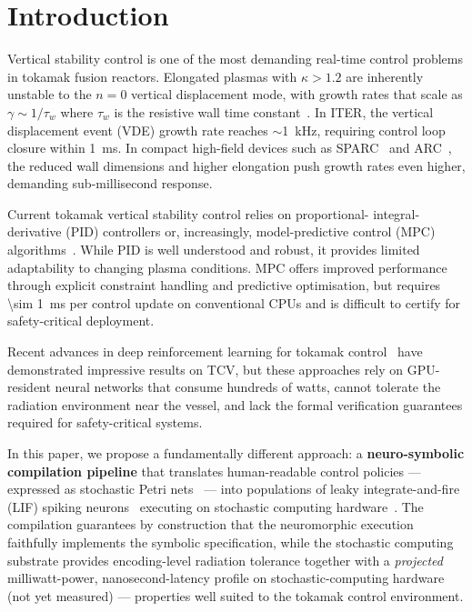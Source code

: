 \documentclass[12pt]{article}
\begin{document}
\section{Introduction}
\label{sec:intro}

Vertical stability control is one of the most demanding real-time
control problems in tokamak fusion reactors.  Elongated plasmas with
$\kappa > 1.2$ are inherently unstable to the $n = 0$ vertical
displacement mode, with growth rates that scale as
$\gamma \sim 1/\tau_w$ where $\tau_w$ is the resistive wall time
constant~\citep{Lazarus1990}.  In ITER, the vertical displacement event
(VDE) growth rate reaches $\sim$\SI{1}{\kilo\hertz}, requiring control
loop closure within \SI{1}{\milli\second}.  In compact high-field
devices such as SPARC~\citep{Creely2020} and
ARC~\citep{Sorbom2015}, the reduced wall dimensions and higher
elongation push growth rates even higher, demanding sub-millisecond
response.

Current tokamak vertical stability control relies on proportional-
integral-derivative (PID) controllers or, increasingly, model-predictive
control (MPC) algorithms~\citep{Humphreys2015,Kolemen2014}.  While PID
is well understood and robust, it provides limited adaptability to
changing plasma conditions.  MPC offers improved performance through
explicit constraint handling and predictive optimisation, but requires
\SI{\sim 1}{\milli\second} per control update on conventional CPUs and
is difficult to certify for safety-critical deployment.

Recent advances in deep reinforcement learning for tokamak
control~\citep{Degrave2022} have demonstrated impressive results on
TCV, but these approaches rely on GPU-resident neural networks that
consume hundreds of watts, cannot tolerate the radiation environment
near the vessel, and lack the formal verification guarantees required
for safety-critical systems.

In this paper, we propose a fundamentally different approach: a
\textbf{neuro-symbolic compilation pipeline} that translates
human-readable control policies --- expressed as stochastic Petri
nets~\citep{Petri1962,Murata1989} --- into populations of
leaky integrate-and-fire (LIF) spiking
neurons~\citep{Maass1997} executing on stochastic computing
hardware~\citep{Gaines1969,Alaghi2013}.  The compilation guarantees by
construction that the neuromorphic execution faithfully implements the
symbolic specification, while the stochastic computing substrate
provides encoding-level radiation tolerance together with a
\emph{projected} milliwatt-power, nanosecond-latency profile on
stochastic-computing hardware (not yet measured) --- properties well
suited to the tokamak control environment.
\end{document}
